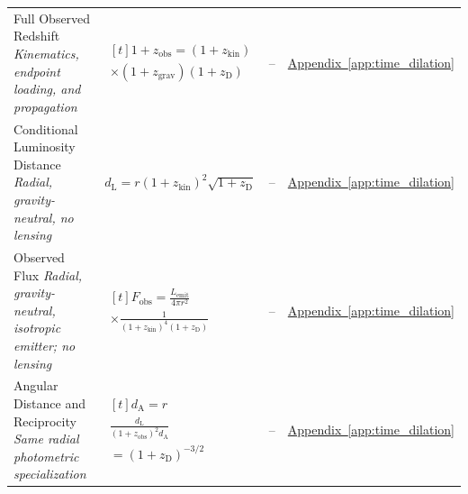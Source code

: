 \begin{longtable}{@{} p{4.5cm} p{6cm} c p{4cm} @{}}
{\raggedright Full Observed Redshift \newline \textit{Kinematics, endpoint loading, and propagation}\par} & {\raggedright $\begin{gathered}[t]1+z_{\mathrm{obs}}=(1+z_{\mathrm{kin}}) \\ \times(1+z_{\mathrm{grav}})(1+z_{\mathrm D})\end{gathered}$\par} & -- & {\raggedright \hyperref[app:time_dilation]{Appendix~\ref*{app:time_dilation}}\par} \\

{\raggedright Conditional Luminosity Distance \newline \textit{Radial, gravity-neutral, no lensing}\par} & {\raggedright $d_{\mathrm L}=r(1+z_{\mathrm{kin}})^2\sqrt{1+z_{\mathrm D}}$\par} & -- & {\raggedright \hyperref[app:time_dilation]{Appendix~\ref*{app:time_dilation}}\par} \\

{\raggedright Observed Flux \newline \textit{Radial, gravity-neutral, isotropic emitter; no lensing}\par} & {\raggedright $\begin{gathered}[t]F_{\mathrm{obs}}=\frac{L_{\mathrm{emit}}}{4\pi r^2} \\ \times\frac{1}{(1+z_{\mathrm{kin}})^4(1+z_{\mathrm D})}\end{gathered}$\par} & -- & {\raggedright \hyperref[app:time_dilation]{Appendix~\ref*{app:time_dilation}}\par} \\

{\raggedright Angular Distance and Reciprocity \newline \textit{Same radial photometric specialization}\par} & {\raggedright $\begin{gathered}[t]d_{\mathrm A}=r \\ \frac{d_{\mathrm L}}{(1+z_{\mathrm{obs}})^2d_{\mathrm A}} \\ =(1+z_{\mathrm D})^{-3/2}\end{gathered}$\par} & -- & {\raggedright \hyperref[app:time_dilation]{Appendix~\ref*{app:time_dilation}}\par} \\


\end{longtable}
